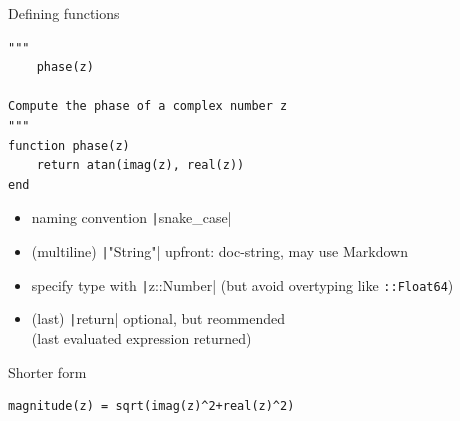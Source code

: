 \documentclass[aspectratio=169, 12pt]{beamer}
\begin{document}
    \begin{frame}[fragile]{Defining functions}
        \begin{verbatim}
"""
    phase(z)

Compute the phase of a complex number z
"""
function phase(z)
    return atan(imag(z), real(z))
end
        \end{verbatim}
        \begin{itemize}[<+->]
            \item \alert{naming convention} \texttt|snake_case|
            \item (multiline) \texttt|"String"| upfront: doc-string, may use  Markdown
            \item specify type with \texttt|z::Number| (but \alert{avoid} overtyping like \texttt{::Float64})
            \item (last) \texttt|return| optional, but reommended\\
            \hfill(last evaluated expression returned)
        \end{itemize}
    \pause
    Shorter form
    \begin{verbatim}
magnitude(z) = sqrt(imag(z)^2+real(z)^2)
    \end{verbatim}
    \end{frame}
\end{document}
